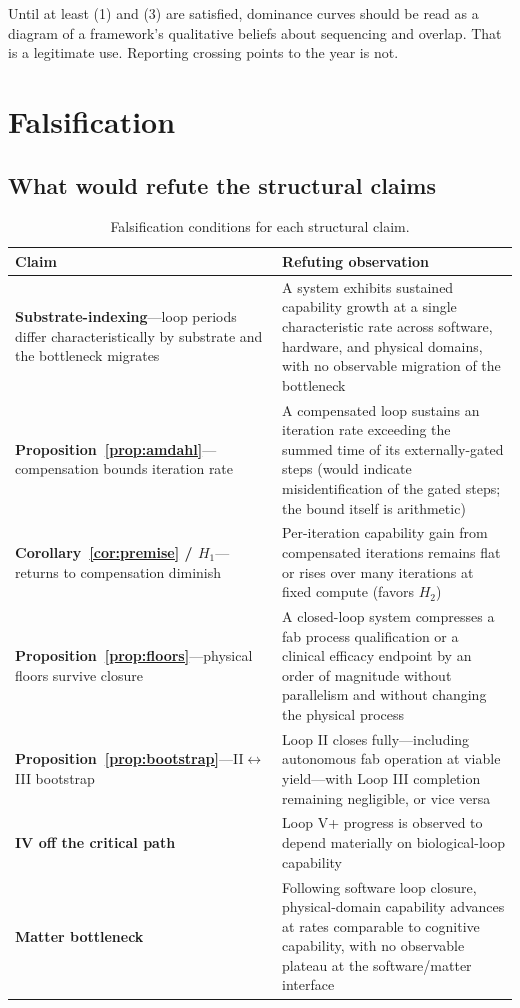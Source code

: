\documentclass[11pt]{article}
\begin{document}
Until at least (1) and (3) are satisfied, dominance curves should be read as a diagram of a framework's qualitative beliefs about sequencing and overlap. That is a legitimate use. Reporting crossing points to the year is not.

\section{Falsification}
\label{sec:falsify}

\subsection{What would refute the structural claims}

\begin{table}[h]
\centering
\footnotesize
\begin{tabular}{@{}L{5.0cm}L{7.8cm}@{}}
\toprule
Claim & Refuting observation \\
\midrule
\textbf{Substrate-indexing}---loop periods differ characteristically by substrate and the bottleneck migrates & A system exhibits sustained capability growth at a single characteristic rate across software, hardware, and physical domains, with no observable migration of the bottleneck \\
\textbf{Proposition~\ref{prop:amdahl}}---compensation bounds iteration rate & A compensated loop sustains an iteration rate exceeding the summed time of its externally-gated steps (would indicate misidentification of the gated steps; the bound itself is arithmetic) \\
\textbf{Corollary~\ref{cor:premise} / $H_1$}---returns to compensation diminish & Per-iteration capability gain from compensated iterations remains flat or rises over many iterations at fixed compute (favors $H_2$) \\
\textbf{Proposition~\ref{prop:floors}}---physical floors survive closure & A closed-loop system compresses a fab process qualification or a clinical efficacy endpoint by an order of magnitude without parallelism and without changing the physical process \\
\textbf{Proposition~\ref{prop:bootstrap}}---II$\leftrightarrow$III bootstrap & Loop II closes fully---including autonomous fab operation at viable yield---with Loop III completion remaining negligible, or vice versa \\
\textbf{IV off the critical path} & Loop V+ progress is observed to depend materially on biological-loop capability \\
\textbf{Matter bottleneck} & Following software loop closure, physical-domain capability advances at rates comparable to cognitive capability, with no observable plateau at the software/matter interface \\
\bottomrule
\end{tabular}
\caption{Falsification conditions for each structural claim.}
\end{table}
\end{document}
